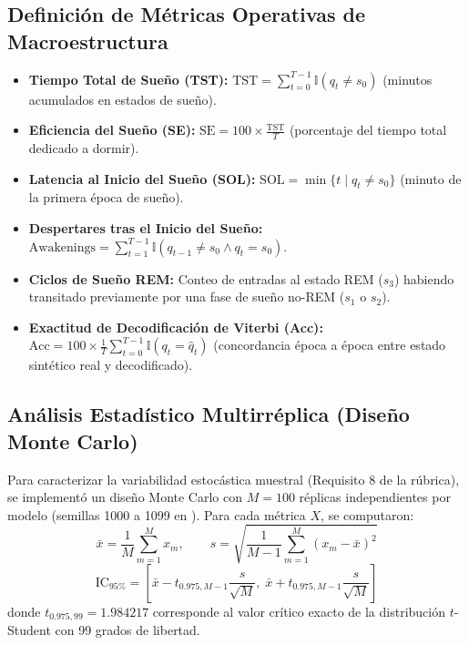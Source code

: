\documentclass[11pt,a4paper]{article}
\begin{document}
\subsection{Definición de Métricas Operativas de Macroestructura}
\begin{itemize}[leftmargin=*,itemsep=1pt]
    \item \textbf{Tiempo Total de Sueño (TST):} $\mathrm{TST} = \sum_{t=0}^{T-1} \mathbb{I}(q_t \ne s_0)$ (minutos acumulados en estados de sueño).
    \item \textbf{Eficiencia del Sueño (SE):} $\mathrm{SE} = 100 \times \frac{\mathrm{TST}}{T}$ (porcentaje del tiempo total dedicado a dormir).
    \item \textbf{Latencia al Inicio del Sueño (SOL):} $\mathrm{SOL} = \min \{ t \mid q_t \ne s_0 \}$ (minuto de la primera época de sueño).
    \item \textbf{Despertares tras el Inicio del Sueño:} $\mathrm{Awakenings} = \sum_{t=1}^{T-1} \mathbb{I}(q_{t-1} \ne s_0 \land q_t = s_0)$.
    \item \textbf{Ciclos de Sueño REM:} Conteo de entradas al estado REM ($s_3$) habiendo transitado previamente por una fase de sueño no-REM ($s_1$ o $s_2$).
    \item \textbf{Exactitud de Decodificación de Viterbi (Acc):} $\mathrm{Acc} = 100 \times \frac{1}{T}\sum_{t=0}^{T-1} \mathbb{I}(q_t = \hat{q}_t)$ (concordancia época a época entre estado sintético real y decodificado).
\end{itemize}

\subsection{Análisis Estadístico Multirréplica (Diseño Monte Carlo)}
Para caracterizar la variabilidad estocástica muestral (Requisito 8 de la rúbrica), se implementó un diseño Monte Carlo con $M = 100$ réplicas independientes por modelo (semillas 1000 a 1099 en ).
Para cada métrica $X$, se computaron:
\begin{equation}
    \bar{x} = \frac{1}{M}\sum_{m=1}^M x_m, \qquad s = \sqrt{\frac{1}{M-1}\sum_{m=1}^M (x_m - \bar{x})^2}
\end{equation}
\begin{equation}
    \mathrm{IC}_{95\%} = \left[ \bar{x} - t_{0.975, M-1} \frac{s}{\sqrt{M}}, \; \bar{x} + t_{0.975, M-1} \frac{s}{\sqrt{M}} \right]
\end{equation}
donde $t_{0.975, 99} = 1.984217$ corresponde al valor crítico exacto de la distribución $t$-Student con 99 grados de libertad.
\end{document}
